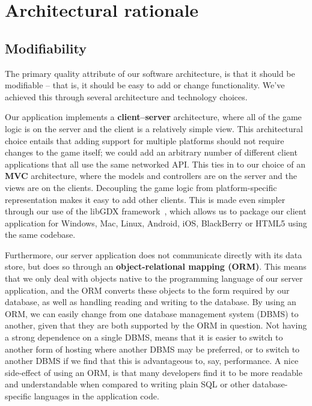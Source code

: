 \section{Architectural rationale}

\subsection{Modifiability}\label{architectural-modifiability}
The primary quality attribute of our software architecture, is that it should be modifiable -- that is, it should be easy to add or change functionality. We've achieved this through several architecture and technology choices.

Our application implements a \textbf{client--server} architecture, where all of the game logic is on the server and the client is a relatively simple view. This architectural choice entails that adding support for multiple platforms should not require changes to the game itself; we could add an arbitrary number of different client applications that all use the same networked API. This ties in to our choice of an \textbf{MVC} architecture, where the models and controllers are on the server and the views are on the clients. Decoupling the game logic from platform-specific representation makes it easy to add other clients. This is made even simpler through our use of the libGDX framework~\cite{libgdx}, which allows us to package our client application for Windows, Mac, Linux, Android, iOS, BlackBerry or HTML5 using the same codebase.

Furthermore, our server application does not communicate directly with its data store, but does so through an \textbf{object-relational mapping (ORM)}. This means that we only deal with objects native to the programming language of our server application, and the ORM converts these objects to the form required by our database, as well as handling reading and writing to the database. By using an ORM, we can easily change from one database management system (DBMS) to another, given that they are both supported by the ORM in question. Not having a strong dependence on a single DBMS, means that it is easier to switch to another form of hosting where another DBMS may be preferred, or to switch to another DBMS if we find that this is advantageous to, say, performance. A nice side-effect of using an ORM, is that many developers find it to be more readable and understandable when compared to writing plain SQL or other database-specific languages in the application code.

